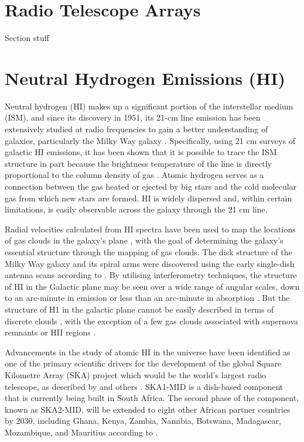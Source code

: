 {\section{Radio Telescope Arrays}
Section stuff



\section{Neutral Hydrogen Emissions (HI)}

Neutral hydrogen (HI) makes up a significant portion of the interstellar medium (ISM), and since its discovery in 1951, its 21-cm line emission has been extensively studied at radio frequencies to gain a better understanding of galaxies, particularly the Milky Way galaxy \cite{storey199421}.
Specifically, using 21 cm surveys of  galactic HI emissions, it has been shown that it is possible to trace the ISM structure in part because the brightness temperature of the line is directly proportional to the column density of gas \cite{crovisier1983spatial}. 
Atomic hydrogen serves as a connection between the gas heated or ejected by big stars and the cold molecular gas from which new stars are formed. HI is widely dispersed and, within certain limitations, is easily observable across the galaxy through the 21 cm line.

Radial velocities calculated from HI spectra have been used to map the locations of gas clouds in the galaxy's plane \cite{bekhti2016hi4pi}, with the goal of determining the galaxy's essential structure through the mapping of gas clouds. The disk structure of the Milky Way galaxy and its spiral arms were discovered using the early single-dish antenna scans according to \cite{dickey2001southern,mcclure2001southern}.
By utilising interferometry techniques, the structure of HI in the Galactic plane may be seen over a wide range of angular scales, down to an arc-minute in emission or less than an arc-minute in absorption  \cite{deshpande2000power,crovisier1985observation,kalberla1985high} . But the structure of H1 in the galactic plane cannot be easily described in terms of discrete clouds \cite{deshpande2000power, clark1965interferometer, clark1962hydrogen}, with the exception of a few gas clouds associated with supernova remnants or HII regions \cite {green1993power, sturner1994association, routledge1991structure}. 


Advancements in the study of atomic HI in the universe have been identified as one of the primary scientific drivers for the development of the global Square Kilometre Array (SKA) project \cite{taylor2012square, schilizzi2011project} which would be the world's largest radio telescope, as described by \cite{taylor2012square} and others  \cite{wang2020ska}. SKA1-MID is a dish-based component that is currently being built in South Africa. The second phase of the component, known as SKA2-MID, will be extended to eight other African partner countries by 2030, including Ghana, Kenya, Zambia, Namibia, Botswana, Madagascar, Mozambique, and Mauritius according to \cite{hoare2018uk}.






}
